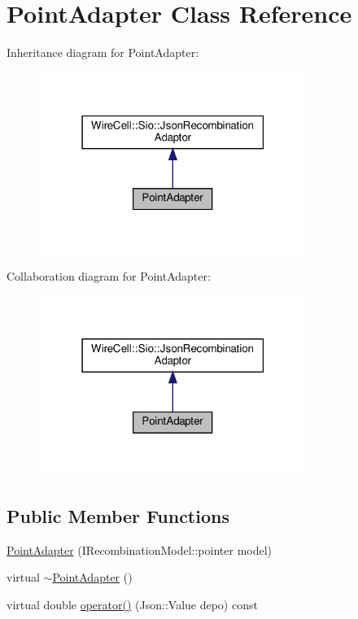 \hypertarget{class_point_adapter}{}\section{Point\+Adapter Class Reference}
\label{class_point_adapter}


Inheritance diagram for Point\+Adapter\+:
\nopagebreak
\begin{figure}[H]
\begin{center}
\leavevmode
\includegraphics[width=247pt]{class_point_adapter__inherit__graph}
\end{center}
\end{figure}


Collaboration diagram for Point\+Adapter\+:
\nopagebreak
\begin{figure}[H]
\begin{center}
\leavevmode
\includegraphics[width=247pt]{class_point_adapter__coll__graph}
\end{center}
\end{figure}
\subsection*{Public Member Functions}
\begin{DoxyCompactItemize}
\item 
\hyperlink{class_point_adapter_a67f1e668f0292b46c61b8e2fd83aa90f}{Point\+Adapter} (I\+Recombination\+Model\+::pointer model)
\item 
virtual \hyperlink{class_point_adapter_a073ab03b01eea2e7f467136077d8c06a}{$\sim$\+Point\+Adapter} ()
\item 
virtual double \hyperlink{class_point_adapter_a37a981e5af75e1d513658dcbb1e35eb3}{operator()} (Json\+::\+Value depo) const
\end{DoxyCompactItemize}


